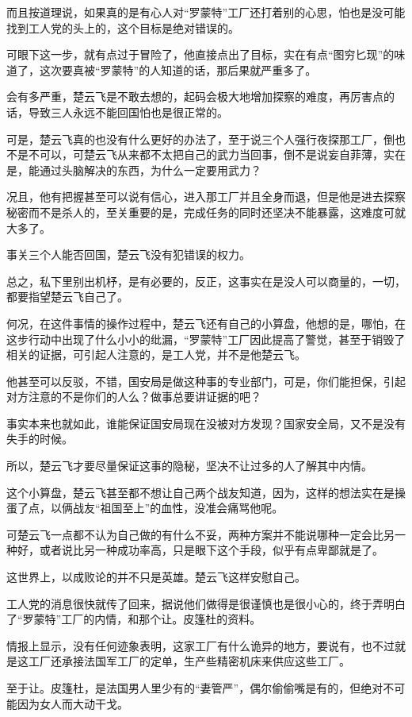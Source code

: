 而且按道理说，如果真的是有心人对“罗蒙特”工厂还打着别的心思，怕也是没可能找到工人党的头上的，这个目标是绝对错误的。

可眼下这一步，就有点过于冒险了，他直接点出了目标，实在有点“图穷匕现”的味道了，这次要真被“罗蒙特”的人知道的话，那后果就严重多了。

会有多严重，楚云飞是不敢去想的，起码会极大地增加探察的难度，再厉害点的话，导致三人永远不能回国怕也是很正常的。

可是，楚云飞真的也没有什么更好的办法了，至于说三个人强行夜探那工厂，倒也不是不可以，可楚云飞从来都不太把自己的武力当回事，倒不是说妄自菲薄，实在是，能通过头脑解决的东西，为什么一定要用武力？

况且，他有把握甚至可以说有信心，进入那工厂并且全身而退，但是他是进去探察秘密而不是杀人的，至关重要的是，完成任务的同时还坚决不能暴露，这难度可就大多了。

事关三个人能否回国，楚云飞没有犯错误的权力。

总之，私下里别出机杼，是有必要的，反正，这事实在是没人可以商量的，一切，都要指望楚云飞自己了。

何况，在这件事情的操作过程中，楚云飞还有自己的小算盘，他想的是，哪怕，在这步行动中出现了什么小小的纰漏，“罗蒙特”工厂因此提高了警觉，甚至于销毁了相关的证据，可引起人注意的，是工人党，并不是他楚云飞。

他甚至可以反驳，不错，国安局是做这种事的专业部门，可是，你们能担保，引起对方注意的不是你们的人么？做事总要讲证据的吧？

事实本来也就如此，谁能保证国安局现在没被对方发现？国家安全局，又不是没有失手的时候。

所以，楚云飞才要尽量保证这事的隐秘，坚决不让过多的人了解其中内情。

这个小算盘，楚云飞甚至都不想让自己两个战友知道，因为，这样的想法实在是操蛋了点，以俩战友“祖国至上”的血性，没准会痛骂他呢。

可楚云飞一点都不认为自己做的有什么不妥，两种方案并不能说哪种一定会比另一种好，或者说比另一种成功率高，只是眼下这个手段，似乎有点卑鄙就是了。

这世界上，以成败论的并不只是英雄。楚云飞这样安慰自己。

工人党的消息很快就传了回来，据说他们做得是很谨慎也是很小心的，终于弄明白了“罗蒙特”工厂的内情，和那个让。皮篷杜的资料。

情报上显示，没有任何迹象表明，这家工厂有什么诡异的地方，要说有，也不过就是这工厂还承接法国军工厂的定单，生产些精密机床来供应这些工厂。

至于让。皮篷杜，是法国男人里少有的“妻管严”，偶尔偷偷嘴是有的，但绝对不可能因为女人而大动干戈。

